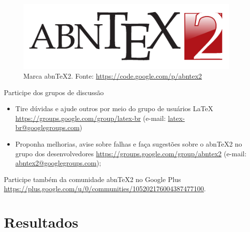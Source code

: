 \documentclass[aspectratio=169]{beamer}	 	%
\begin{document}
\begin{frame}

\begin{figure}
  \centering
  \includegraphics[scale=1.0]{abntex2-marca.pdf}
  \caption{Marca abnTeX2. Fonte: \url{https://code.google.com/p/abntex2}}
\end{figure}

\end{frame}

\begin{frame}{Participe dos grupos de discussão}

\begin{itemize}
  \item Tire dúvidas e ajude outros por meio do grupo de usuários LaTeX \url{https://groups.google.com/group/latex-br} (e-mail: \url{latex-br@googlegroups.com})
  \item Proponha melhorias, avise sobre falhas e faça sugestões sobre o abnTeX2 no grupo dos desenvolvedores \url{https://groups.google.com/group/abntex2} (e-mail: \url{abntex2@googlegroups.com});
\end{itemize}

Participe também da comunidade abnTeX2 no Google Plus \url{https://plus.google.com/u/0/communities/105202176004387477100}.

\end{frame}

\section{Resultados}
\end{document}
